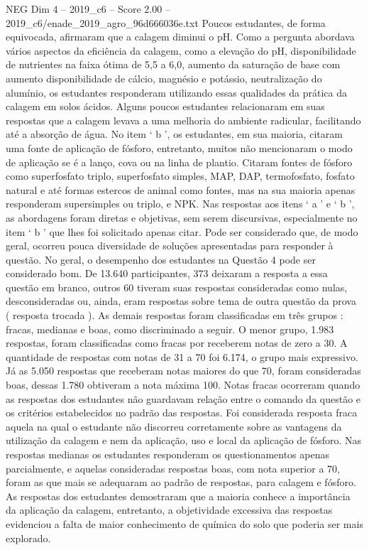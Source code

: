 \begin{textsample}{NEG Dim 4 – 2019\_c6 – Score 2.00 – 2019\_c6/enade\_2019\_agro\_96d666036e.txt}
Poucos estudantes, de forma equivocada, afirmaram que a calagem diminui o pH.
Como a pergunta abordava vários aspectos da eficiência da calagem, como a elevação do pH, disponibilidade de nutrientes na faixa ótima de 5,5 a 6,0, aumento da saturação de base com aumento disponibilidade de cálcio, magnésio e potássio, neutralização do alumínio, os estudantes responderam utilizando essas qualidades da prática da calagem em solos ácidos.
Alguns poucos estudantes relacionaram em suas respostas que a calagem levava a uma melhoria do ambiente radicular, facilitando até a absorção de água.
No item ‘ b ’, os estudantes, em sua maioria, citaram uma fonte de aplicação de fósforo, entretanto, muitos não mencionaram o modo de aplicação se é a lanço, cova ou na linha de plantio.
Citaram fontes de fósforo como superfosfato triplo, superfosfato simples, MAP, DAP, termofosfato, fosfato natural e até formas estercos de animal como fontes, mas na sua maioria apenas responderam supersimples ou triplo, e NPK.
Nas respostas aos itens ‘ a ’ e ‘ b ’, as abordagens foram diretas e objetivas, sem serem discursivas, especialmente no item ‘ b ’ que lhes foi solicitado apenas citar.
Pode ser considerado que, de modo geral, ocorreu pouca diversidade de soluções apresentadas para responder à questão.
No geral, o desempenho dos estudantes na Questão 4 pode ser considerado bom.
De 13.640 participantes, 373 deixaram a resposta a essa questão em branco, outros 60 tiveram suas respostas consideradas como nulas, desconsideradas ou, ainda, eram respostas sobre tema de outra questão da prova ( resposta trocada ).
As demais respostas foram classificadas em três grupos : fracas, medianas e boas, como discriminado a seguir.
O menor grupo, 1.983 respostas, foram classificadas como fracas por receberem notas de zero a 30.
A quantidade de respostas com notas de 31 a 70 foi 6.174, o grupo mais expressivo.
Já as 5.050 respostas que receberam notas maiores do que 70, foram consideradas boas, dessas 1.780 obtiveram a nota máxima 100.
Notas fracas ocorreram quando as respostas dos estudantes não guardavam relação entre o comando da questão e os critérios estabelecidos no padrão das respostas.
Foi considerada resposta fraca aquela na qual o estudante não discorreu corretamente sobre as vantagens da utilização da calagem e nem da aplicação, uso e local da aplicação de fósforo.
Nas respostas medianas os estudantes responderam os questionamentos apenas parcialmente, e aquelas consideradas respostas boas, com nota superior a 70, foram as que mais se adequaram ao padrão de respostas, para calagem e fósforo.
As respostas dos estudantes demostraram que a maioria conhece a importância da aplicação da calagem, entretanto, a objetividade excessiva das respostas evidenciou a falta de maior conhecimento de química do solo que poderia ser mais explorado.

\end{textsample}
